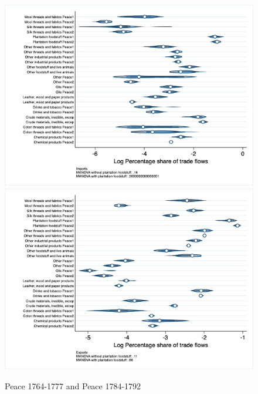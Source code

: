 \documentclass[12pt,a4paper,notitlepage,english]{article}
\begin{document}
\begin{appendix}
\begin{figure}[h!]
\centering
\caption{Peace 1764-1777 and Peace 1784-1792}
\label{seven_peace1764_1777_nat_distr_sitc}
\includegraphics[scale=.4]{peace1764_1777_peace1784_1792_nat_distr_Isitc}
\includegraphics[scale=.4]{peace1764_1777_peace1784_1792_nat_distr_Xsitc}
\end{figure}


\end{appendix}
\end{document}
